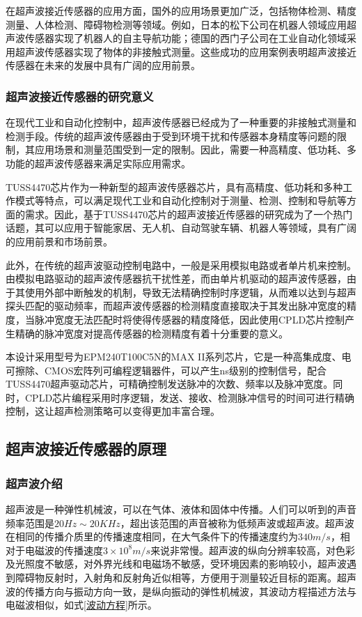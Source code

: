     在超声波接近传感器的应用方面，国外的应用场景更加广泛，包括物体检测、精度测量、人体检测、障碍物检测等领域。例如，日本的松下公司在机器人领域应用超声波传感器实现了机器人的自主导航功能；德国的西门子公司在工业自动化领域采用超声波传感器实现了物体的非接触式测量。这些成功的应用案例表明超声波接近传感器在未来的发展中具有广阔的应用前景。
    
    \subsubsection{超声波接近传感器的研究意义}
    在现代工业和自动化控制中，超声波传感器已经成为了一种重要的非接触式测量和检测手段。传统的超声波传感器由于受到环境干扰和传感器本身精度等问题的限制，其应用场景和测量范围受到一定的限制。因此，需要一种高精度、低功耗、多功能的超声波传感器来满足实际应用需求。\par
    TUSS4470芯片作为一种新型的超声波传感器芯片，具有高精度、低功耗和多种工作模式等特点，可以满足现代工业和自动化控制对于测量、检测、控制和导航等方面的需求。因此，基于TUSS4470芯片的超声波接近传感器的研究成为了一个热门话题，其可以应用于智能家居、无人机、自动驾驶车辆、机器人等领域，具有广阔的应用前景和市场前景。\par
    此外，在传统的超声波驱动控制电路中，一般是采用模拟电路或者单片机来控制。由模拟电路驱动的超声波传感器抗干扰性差，而由单片机驱动的超声波传感器，由于其使用外部中断触发的机制，导致无法精确控制时序逻辑，从而难以达到与超声探头匹配的驱动频率，而超声波传感器的检测精度直接取决于其发出脉冲宽度的精度，当脉冲宽度无法匹配时将使得传感器的精度降低，因此使用CPLD芯片控制产生精确的脉冲宽度对提高传感器的检测精度有着十分重要的意义。\par
    本设计采用型号为EPM240T100C5N的MAX II系列芯片，它是一种高集成度、电可擦除、CMOS宏阵列可编程逻辑器件，可以产生ns级别的控制信号，配合TUSS4470超声驱动芯片，可精确控制发送脉冲的次数、频率以及脉冲宽度。同时，CPLD芯片编程采用时序逻辑，发送、接收、检测脉冲信号的时间可进行精确控制，这让超声检测策略可以变得更加丰富合理。
    \subsection{超声波接近传感器的原理}
    \subsubsection{超声波介绍}
      超声波是一种弹性机械波，可以在气体、液体和固体中传播。人们可以听到的声音频率范围是$20Hz\sim20KHz$，超出该范围的声音被称为低频声波或超声波。超声波在相同的传播介质里的传播速度相同，在大气条件下的传播速度约为$340m/s$，相对于电磁波的传播速度$3\times10^8m/s$来说非常慢。超声波的纵向分辨率较高，对色彩及光照度不敏感，对外界光线和电磁场不敏感，受环境因素的影响较小，超声波遇到障碍物反射时，入射角和反射角近似相等，方便用于测量较近目标的距离。超声波的传播方向与振动方向一致，是纵向振动的弹性机械波，其波动方程描述方法与电磁波相似，如式\ref{波动方程}所示。

